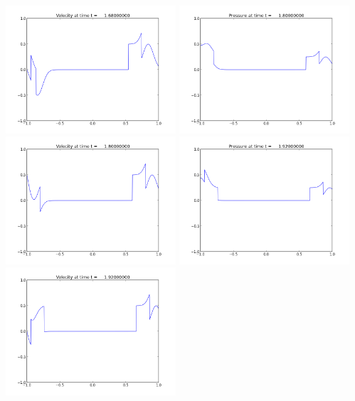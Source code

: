 \documentclass[11pt]{article}
\begin{document}
\includegraphics[width=0.475\textwidth]{frame0014fig2.png}
\vskip 10pt 
\includegraphics[width=0.475\textwidth]{frame0015fig1.png}
\includegraphics[width=0.475\textwidth]{frame0015fig2.png}
\vskip 10pt 
\includegraphics[width=0.475\textwidth]{frame0016fig1.png}
\includegraphics[width=0.475\textwidth]{frame0016fig2.png}
\end{document}
